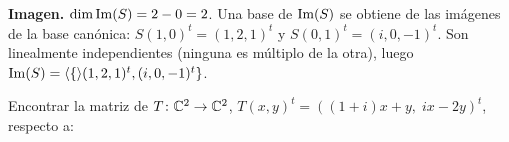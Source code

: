 \begin{questions}
\begin{solution}
\begin{parts}
      \textbf{Imagen.} $\dim\operatorname{Im}(S)=2-0=2$. Una base de $\operatorname{Im}(S)$ se obtiene de las imágenes de la base canónica: $S(1,0)^t=(1,2,1)^t$ y $S(0,1)^t=(i,0,-1)^t$. Son linealmente independientes (ninguna es múltiplo de la otra), luego $\operatorname{Im}(S)=\langle \{ \rangle(1,2,1)^t,(i,0,-1)^t\}$.
    \end{parts}
  \end{solution}


  \question
  Encontrar la matriz de $T\colon\mathbb{C}^2\to\mathbb{C}^2$, $T(x,y)^t=((1+i)x+y,\;ix-2y)^t$, respecto a:
  \begin{solution}
\end{solution}
\end{questions}
